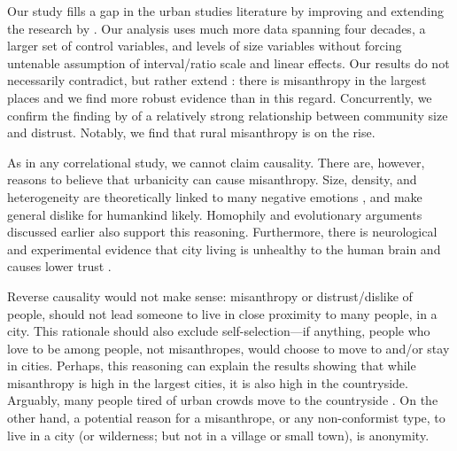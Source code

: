 \documentclass[11pt, letterpaper]{article}
\begin{document}
\begin{spacing}{1.4}
Our study fills a gap in the urban studies literature by improving and extending the research by \citet{wilson85}. Our analysis uses much more data spanning four decades, a larger set of control variables, and levels of size variables without
forcing untenable assumption of interval/ratio scale and linear effects. Our
results do not necessarily contradict, but rather extend \citet{wilson85}: there
is misanthropy in the largest places %
and we find more robust evidence than \citet{wilson85} in this regard. Concurrently, we confirm the finding by \citet{fischer81} of a relatively strong relationship between community size and distrust. Notably, we find that rural misanthropy is on the rise.


As in any correlational study, we cannot claim causality. There are, however,
reasons to believe that urbanicity can cause misanthropy. Size, density, and
heterogeneity are theoretically linked to many negative emotions
\citep{wirth38}, and make general dislike for humankind likely. Homophily and
evolutionary arguments discussed earlier also support this reasoning. {Furthermore, there is neurological and experimental evidence that city living is unhealthy to the human brain \citep{lederbogen11} and causes lower trust \citep{milgram70}.}

Reverse causality would not make sense: misanthropy or distrust/dislike of people, should
not lead someone to live in close proximity to many people, in a city. This rationale should also exclude self-selection---if anything, people who
 love to be among  people, not misanthropes, would choose to move to and/or stay in cities. Perhaps, this reasoning can explain the results showing that while misanthropy is high in the largest
cities, it is also high in the countryside. Arguably, many people tired of urban crowds move to the countryside \citep[e.g.,][]{deweyWP17nov23}.
%
On the other hand, a potential reason for a misanthrope, or any  non-conformist type, to live in a city (or wilderness; but not in a village or small town), is anonymity.


\end{spacing}
\end{document}
